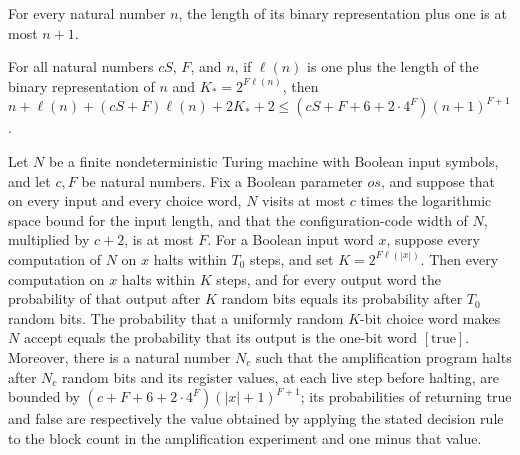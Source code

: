 \begin{theorem}
\label{Randomized.PolyAmp.ell_le}
\leanok
{}
For every natural number $n$, the length of its binary representation plus one is at
most $n+1$.
\end{theorem}

\begin{theorem}
\label{Randomized.PolyAmp.regBound_le}
\leanok
{}
For all natural numbers $cS$, $F$, and $n$, if $\ell(n)$ is one plus the length of the
binary representation of $n$ and $K_*=2^{F\ell(n)}$, then
$n+\ell(n)+(cS+F)\ell(n)+2K_*+2\le(cS+F+6+2\cdot4^F)(n+1)^{F+1}$.
\end{theorem}

\begin{theorem}
\label{Randomized.polyAmp_setting}
\leanok
{}
Let $N$ be a finite nondeterministic Turing machine with Boolean input symbols, and let
$c,F$ be natural numbers. Fix a Boolean parameter $os$, and suppose that on every input
and every choice word, $N$ visits at most $c$ times the logarithmic space bound for the
input length, and that the configuration-code width of $N$, multiplied by $c+2$, is at
most $F$. For a Boolean input word $x$, suppose every computation of $N$ on $x$ halts
within $T_0$ steps, and set $K=2^{F\ell(|x|)}$. Then every computation on $x$ halts
within $K$ steps, and for every output word the probability of that output after $K$
random bits equals its probability after $T_0$ random bits. The probability that a
uniformly random $K$-bit choice word makes $N$ accept equals the probability that its
output is the one-bit word $[\mathrm{true}]$. Moreover, there is a natural number $N_c$
such that the amplification program halts after $N_c$ random bits and its register
values, at each live step before halting, are bounded by
$(c+F+6+2\cdot4^F)(|x|+1)^{F+1}$; its probabilities of returning true and false are
respectively the value obtained by applying the stated decision rule to the block count
in the amplification experiment and one minus that value.
\end{theorem}

